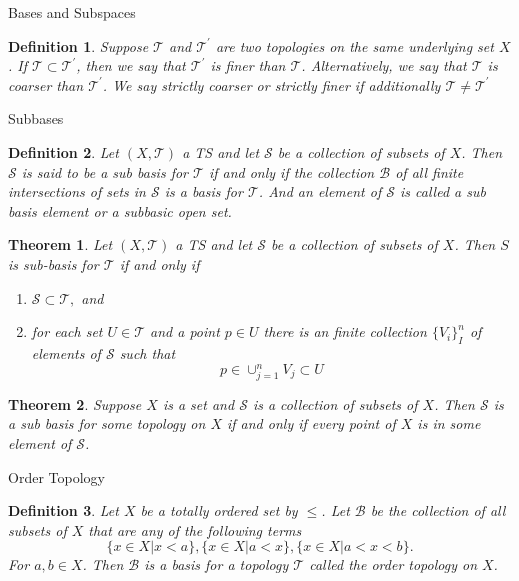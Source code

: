 \documentclass[12pt]{article}
\newtheorem{definition}{Definition}[section]
\newtheorem{theorem}{Theorem}[section]
\begin{document}
\begin{section}{Bases and Subspaces}
\begin{definition}
Suppose $\mathcal{T}$ and $\mathcal{T}^{\prime}$ are two topologies on the same underlying set $X$. If $\mathcal{T}\subset\mathcal{T}^{\prime}$, then we say that $\mathcal{T}^{\prime}$ is finer than $\mathcal{T}$. Alternatively, we say that $\mathcal{T}$ is coarser than  $\mathcal{T}^{\prime}$. We say strictly coarser or strictly finer if additionally $\mathcal{T}\neq\mathcal{T}^{\prime}$
\end{definition}

\begin{subsection}{Subbases}

\begin{definition}
Let $\left(X, \mathcal{T}\right)$ a TS and let $\mathcal{S}$ be a collection of subsets of $X$. Then $\mathcal{S}$ is said to be a sub basis for $\mathcal{T}$ if and only if the collection $\mathcal{B}$ of all finite intersections of sets in $\mathcal{S}$ is a basis for $\mathcal{T}$. And an element of $\mathcal{S}$ is called a sub basis element or a subbasic open set.
\end{definition}

\begin{theorem}
Let $\left(X, \mathcal{T}\right)$ a TS and let $\mathcal{S}$ be a collection of subsets of $X$. Then $S$ is sub-basis for $\mathcal{T}$ if and only if
	\begin{enumerate}
	\item $\mathcal{S}\subset\mathcal{T},$ and
	\item for each set $U\in \mathcal{T}$ and a point $p\in U$ there is an finite collection $\{ V_{i}\}_{I}^{n}$ of elements of $\mathcal{S}$ such that 
	$$ 
		p\in \cup_{j=1}^{n}V_{j}\subset U
	$$
	\end{enumerate}
\end{theorem}

\begin{theorem}
Suppose $X$ is a set and $\mathcal{S}$ is a collection of subsets of $X$. Then $\mathcal{S}$ is a sub basis for some topology on $X$ if and only if every point of $X$ is in some element of $\mathcal{S}$.
\end{theorem}

\end{subsection}

\begin{subsection}{Order Topology}

\begin{definition}
Let $X$ be a totally ordered set by $\leq$. Let $\mathcal{B}$ be the collection of all subsets of $X$ that are any of the following terms
$$
	\{ x\in X | x < a \}, \{ x\in X | a < x\}, \{x\in X | a< x < b\}.
$$
For $a,b\in X$. Then $\mathcal{B}$ is a basis for a topology $\mathcal{T}$ called the order topology on $X$.
\end{definition}


\end{subsection}
\end{section}
\end{document}
